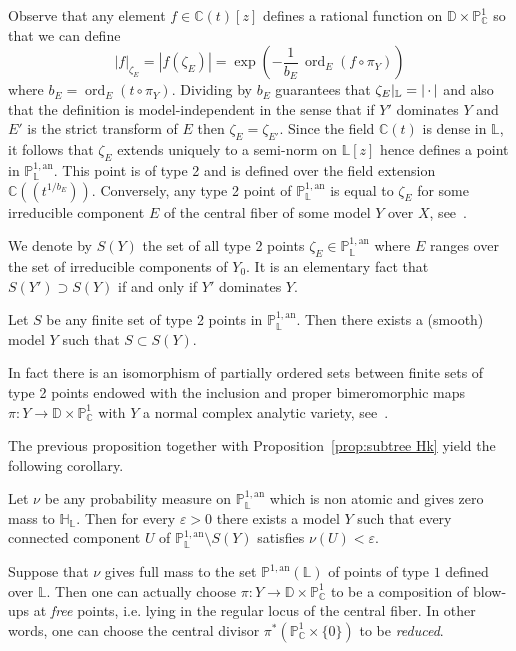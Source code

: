 \documentclass[AHL,Unicode,longabstracts]{cedram}
\DeclareMathOperator{\ord}{ord}
\newcommand{\cc}{\mathbb{C}}
\newcommand{\hh}{\mathbb{H}}
\newcommand{\D}{\mathbb{D}}
\newcommand{\an}{\mathrm{an}}
\newcommand{\e}{\varepsilon}
\newcommand{\abs}[1]{\left\vert#1\right\vert}
\newcommand{\PP}{\mathbb{P}}
\newcommand{\berkl}{\mathbb P^{1,\an}_{\Laurent}}
\newcommand{\Laurent}{\mathbb{L}}
\newcommand{\rest}[1]{ \arrowvert_{#1}}
\begin{document}
Observe that any element $f\in \cc(t)[z]$ defines a rational function on $\D \times \PP^1_\cc$ so that we can define
\[
\abs{f}_{\zeta_E} = |f(\zeta_E)| = \exp \left(- \frac1{b_E}\, \ord_E(f \circ \pi_Y)\right)
\]
where $b_E = \ord_E (t \circ \pi_Y)$. Dividing by $b_E$ guarantees that $\zeta_E\rest{\Laurent} = \abs{{\,\cdot\,}}$ and also that the definition is model-independent in the sense that if $Y'$ dominates $Y$ and $E'$ is the strict transform of $E$ then $\zeta_E=\zeta_{E'}$. Since the field $\cc(t)$ is dense in $\Laurent$, it follows that $\zeta_E$ extends uniquely to a semi-norm on $\Laurent[z]$ hence defines a point in $\PP^{1,\an}_{\Laurent}$. This point is of type 2 and is defined over the field extension $\cc(\!(t^{1/{b_E}})\!)$. Conversely, any type 2 point of $\PP^{1,\an}_{\Laurent}$ is equal to $\zeta_E$ for some irreducible component $E$ of the central fiber of some model $Y$ over $X$, see~\cite[Lem.~7.16]{NL}.

We denote by $ S(Y)$ the set of all type 2 points $\zeta_E \in \PP^{1,\an}_{\Laurent}$ where $E$ ranges over the set of irreducible components of $Y_0$. It is an elementary fact that $S(Y') \supset S(Y)$ if and only if $Y'$ dominates $Y$.

\begin{prop}
Let $S$ be any finite set of type 2 points in $\PP^{1,\an}_{\Laurent}$. Then there exists a (smooth) model $Y$ such that $S \subset S(Y)$.
\end{prop}

\begin{rema}
In fact there is an isomorphism of partially ordered sets between finite sets of type 2 points endowed with the inclusion and proper bimeromorphic maps $\pi: Y \to \D \times \PP^1_\cc$ with $Y$ a normal complex analytic variety, see~\cite[Thm.~7.18]{NL}.
\end{rema}

The previous proposition together with Proposition~\ref{prop:subtree Hk} yield the following corollary.

\begin{coro}\label{cor:cut to small}
Let $\nu$ be any probability measure on $\berkl$ which is non atomic and gives zero mass to $\hh_\Laurent$. Then for every $\e>0$ there exists a model $Y$ such that every connected component $U$ of $\berkl\setminus S(Y)$ satisfies $\nu(U)<\e$.
\end{coro}

\begin{rema}\label{rem:useless}
Suppose that $\nu$ gives full mass to the set $\PP^{1,\an}(\Laurent)$ of points of type $1$ defined over $\Laurent$. Then one can actually choose $\pi: Y \to \D\times \PP^{1}_\cc $ to be a composition of blow-ups at \emph{free} points, i.e. lying in the regular locus of the central fiber. In other words, one can choose the central divisor $\pi^* (\PP^{1}_\cc \times \{ 0 \})$ to be \emph{reduced}.
\end{rema}
\end{document}
